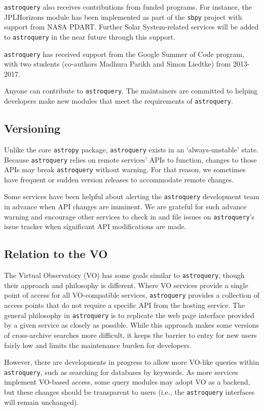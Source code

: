 \documentclass[twocolumn]{aastex61}
\newcommand{\package}[1]{\texttt{#1}\xspace}
\newcommand{\astroquery}{\package{astroquery}}
\newcommand{\astropypkg}{\package{astropy}}
\begin{document}
\astroquery also receives contributions from funded programs. For instance, the JPLHorizons module has been implemented as part of the \texttt{sbpy} project with support from NASA PDART. Further Solar System-related services will be added to \astroquery in the near future through this support.  


\astroquery has received support from the Google Summer of Code
program, with two students (co-authors Madhura Parikh and Simon Liedtke)
from 2013-2017.

Anyone can contribute to \astroquery.  The maintainers are committed to helping
developers make new modules that meet the requirements of \astroquery.

\subsection{Versioning}
Unlike the core \astropypkg package, \astroquery exists in an `always-unstable' state.
Because \astroquery relies on remote services' APIs to function, changes to those
APIs may break \astroquery without warning.  For that reason, we sometimes have
frequent or sudden version releases to accommodate remote changes.

Some services have been helpful about alerting the \astroquery development team
in advance when API changes are imminent.  We are grateful for such advance
warning and encourage other services to check in and file issues on \astroquery's
issue tracker when significant API modifications are made.

\subsection{Relation to the VO}

The Virtual Observatory (VO) has some goals similar to \astroquery,
though their approach and philosophy is different.  Where VO services provide a
single point of access for all VO-compatible services, \astroquery
provides a collection of access points that do not require a specific API from
the hosting service.  The general philosophy in \astroquery is to
replicate the web page interface provided by a given service as closely as
possible.  While this approach makes some versions of cross-archive searches
more difficult, it keeps the barrier to entry for new users fairly low and limits
the maintenance burden for developers.

However, there are developments in progress to allow more VO-like queries
within \astroquery, such as searching for databases by keywords.  As more
services implement VO-based access, some query modules may adopt VO as a backend,
but these changes should be transparent to users (i.e., the \astroquery
interfaces will remain unchanged).
\end{document}
